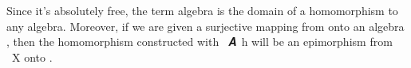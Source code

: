 \begin{code}
\>[2]\<%
\\
%
\>[2]\AgdaSpace{}%
\AgdaSymbol{:}\AgdaSpace{}%
\AgdaSymbol{(}\AgdaSpace{}%
\AgdaSpace{}%
\AgdaSymbol{)}\AgdaSpace{}%
\AgdaSymbol{(}\AgdaSpace{}%
\AgdaSpace{}%
\AgdaSpace{}%
\AgdaSpace{}%
\AgdaSymbol{)}\AgdaSpace{}%
\AgdaSpace{}%
\AgdaSymbol{(}\AgdaSpace{}%
\AgdaSpace{}%
\AgdaSymbol{)}\AgdaSpace{}%
\AgdaSymbol{(}\AgdaSpace{}%
\AgdaSpace{}%
\AgdaSpace{}%
\AgdaSpace{}%
\AgdaSymbol{)}\<%
\\
%
\>[2]\AgdaSpace{}%
\AgdaSymbol{=}\AgdaSpace{}%
\AgdaSpace{}%
\AgdaSymbol{(}\AgdaSpace{}%
\AgdaSpace{}%
\AgdaSymbol{)}\AgdaSpace{}%
\AgdaSymbol{(}\AgdaSpace{}%
\AgdaSpace{}%
\AgdaSpace{}%
\AgdaSpace{}%
\AgdaSpace{}%
\AgdaSpace{}%
\AgdaSpace{}%
\AgdaSpace{}%
\AgdaSpace{}%
\AgdaSpace{}%
\AgdaSymbol{(}\AgdaSpace{}%
\AgdaSymbol{))}\<%
\end{code}
\ccpad
Since it's absolutely free, the term algebra is the domain of a homomorphism to any algebra. Moreover, if we are given a surjective mapping  from  onto an algebra , then the homomorphism constructed with ~\ab 𝑨~\ab h will be an epimorphism from ~\ab X onto .
\ccpad
